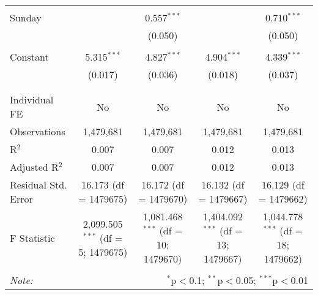 \documentclass[
]{article}
\begin{document}
\begin{table}[!htbp]
{\begin{tabular}{@{\extracolsep{5pt}}lcccc}
  & & & & \\ 
 Sunday &  & 0.557$^{***}$ &  & 0.710$^{***}$ \\ 
  &  & (0.050) &  & (0.050) \\ 
  & & & & \\ 
 Constant & 5.315$^{***}$ & 4.827$^{***}$ & 4.904$^{***}$ & 4.339$^{***}$ \\ 
  & (0.017) & (0.036) & (0.018) & (0.037) \\ 
  & & & & \\ 
\hline \\[-1.8ex] 
Individual FE & No & No & No & No \\ 
Observations & 1,479,681 & 1,479,681 & 1,479,681 & 1,479,681 \\ 
R$^{2}$ & 0.007 & 0.007 & 0.012 & 0.013 \\ 
Adjusted R$^{2}$ & 0.007 & 0.007 & 0.012 & 0.013 \\ 
Residual Std. Error & 16.173 (df = 1479675) & 16.172 (df = 1479670) & 16.132 (df = 1479667) & 16.129 (df = 1479662) \\ 
F Statistic & 2,099.505$^{***}$ (df = 5; 1479675) & 1,081.468$^{***}$ (df = 10; 1479670) & 1,404.092$^{***}$ (df = 13; 1479667) & 1,044.778$^{***}$ (df = 18; 1479662) \\ 
\hline 
\hline \\[-1.8ex] 
\textit{Note:}  & \multicolumn{4}{r}{$^{*}$p$<$0.1; $^{**}$p$<$0.05; $^{***}$p$<$0.01} \\ 
\end{tabular}
} 
\end{table} 
\newpage
\end{document}
